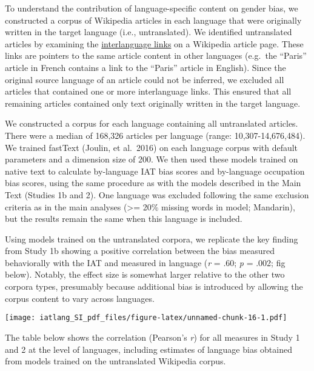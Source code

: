 \documentclass[]{article}
\begin{document}
To understand the contribution of language-specific content on gender
bias, we constructed a corpus of Wikipedia articles in each language
that were originally written in the target language (i.e.,
untranslated). We identified untranslated articles by examining the
\href{https://en.wikipedia.org/wiki/Help:Interlanguage_links}{interlanguage
links} on a Wikipedia article page. These links are pointers to the same
article content in other languages (e.g.~the ``Paris'' article in French
contains a link to the ``Paris'' article in English). Since the original
source language of an article could not be inferred, we excluded all
articles that contained one or more interlanguage links. This ensured
that all remaining articles contained only text originally written in
the target language.

We constructed a corpus for each language containing all untranslated
articles. There were a median of 168,326 articles per language (range:
10,307-14,676,484). We trained fastText (Joulin, et al.~2016) on each
language corpus with default parameters and a dimension size of 200. We
then used these models trained on native text to calculate by-language
IAT bias scores and by-language occupation bias scores, using the same
procedure as with the models described in the Main Text (Studies 1b and
2). One language was excluded following the same exclusion criteria as
in the main analyses (\textgreater= 20\% missing words in model;
Mandarin), but the results remain the same when this language is
included.

Using models trained on the untranslated corpora, we replicate the key
finding from Study 1b showing a positive correlation between the bias
measured behaviorally with the IAT and measured in language (\emph{r} =
.60; \emph{p} = .002; fig below). Notably, the effect size is somewhat
larger relative to the other two corpora types, presumably because
additional bias is introduced by allowing the corpus content to vary
across languages.

\texttt{[image: iatlang\_SI\_pdf\_files/figure-latex/unnamed-chunk-16-1.pdf]}

The table below shows the correlation (Pearson's \emph{r}) for all
measures in Study 1 and 2 at the level of languages, including estimates
of language bias obtained from models trained on the untranslated
Wikipedia corpus.
\end{document}
